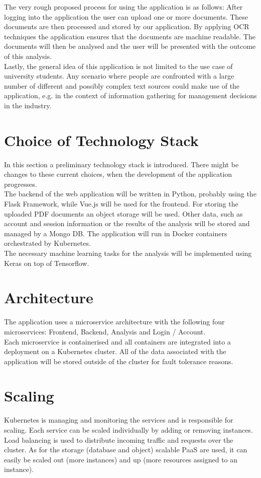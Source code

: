 \documentclass[conference]{IEEEtran}
\begin{document}
The very rough proposed process for using the application is as follows: After logging into the application the user can
upload one or more documents. These documents are then processed and stored by our application. By applying
OCR techniques the application ensures that the documents are machine readable. The documents will then
be analysed and the user will be presented with the outcome of this analysis. \\

Lastly, the general idea of this application is not limited to the use case of university students.
Any scenario where people are confronted with a large number of different and possibly complex text
sources could make use of the application, e.g. in the context of information gathering for management
decisions in the industry.

\section{Choice of Technology Stack}
In this section a  preliminary technology stack is introduced. There might be changes to these current
choices, when the development of the application progresses. \\
The backend of the web application will be written in Python, probably using the Flask Framework, 
while Vue.js will be used for the frontend.
For storing the uploaded PDF documents an object storage will be used. Other data, such as account and
session information or the results of the analysis will be stored and managed by a Mongo DB.
The application will run in Docker containers orchestrated by Kubernetes. \\
The necessary machine learning tasks for the analysis will be implemented using Keras on top of Tensorflow.

\section{Architecture}
The application uses a microservice architecture with the following four microservices: Frontend, Backend,
Analysis and Login / Account. \\
Each microservice is containerised and all containers are integrated into a deployment on a Kubernetes cluster.
All of the data associated with the application will be stored outside of the cluster for fault tolerance
reasons.

\section{Scaling}
Kubernetes is managing and monitoring the services and is responsible for scaling. Each service can be
scaled individually by adding or removing instances. \\
Load balancing is used to distribute incoming traffic and requests over the cluster.
As for the storage (database and object) scalable PaaS are used, it can easily be scaled out (more instances)
and up (more resources assigned to an instance).
\end{document}

